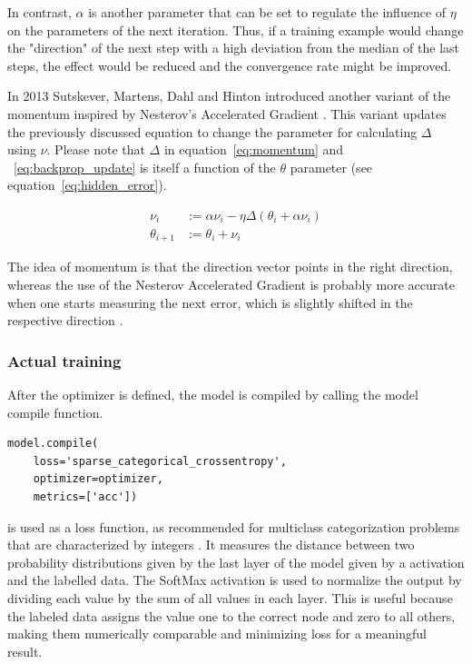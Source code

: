 In contrast, $\alpha$ is another parameter that can be set to regulate the influence of $\eta$ on the parameters of the next iteration.
Thus, if a training example would change the "direction" of the next step with a high deviation from the median of the last steps, the effect would be reduced and the convergence rate might be improved. 

In 2013 Sutskever, Martens, Dahl and Hinton \cite{Sutskever2013} introduced another variant of the momentum inspired by Nesterov's Accelerated Gradient \cite{Nesterov1983}.
This variant updates the previously discussed equation to change the parameter for calculating $\varDelta$ using $\nu$.
Please note that $\varDelta$ in equation~\eqref{eq:momentum} and ~\eqref{eq:backprop_update} is itself a function of the $\theta$ parameter (see equation~\eqref{eq:hidden_error}).

\begin{equation}
    \begin{split}
    \nu_i & := \alpha \nu_i - \eta \varDelta(\theta_i + \alpha \nu_i) \\
    \theta_{i+1} & := \theta_i + \nu_i
    \end{split}
    \label{eq:nesterov}
\end{equation}

The idea of momentum is that the direction vector points in the right direction, whereas the use of the Nesterov Accelerated Gradient is probably more accurate when one starts measuring the next error, which is slightly shifted in the respective direction \cite[p.353]{Geron2019} \cite[p.291]{Goodfellow2017}.

\subsubsection{Actual training}

After the optimizer is defined, the model is compiled by calling the model compile function.

\begin{lstlisting}
model.compile(
    loss='sparse_categorical_crossentropy', 
    optimizer=optimizer,
    metrics=['acc'])
\end{lstlisting}

 is used as a loss function, as recommended for multiclass categorization problems that are characterized by integers \cite[p.84]{Chollet2017}.
It measures the distance between two probability distributions given by the last layer of the model given by a  activation and the labelled data.
The SoftMax activation is used to normalize the output by dividing each value by the sum of all values in each layer.
This is useful because the labeled data assigns the value one to the correct node and zero to all others, making them numerically comparable and minimizing loss for a meaningful result.

